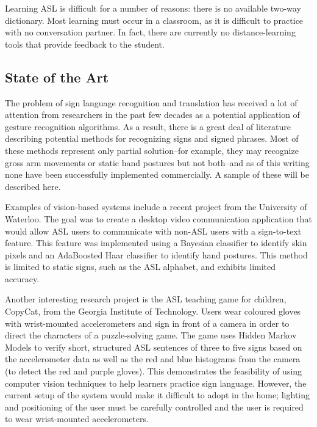 \documentclass[12pt]{article}
\begin{document}
Learning ASL is difficult for a number of reasons: there is no available two-way dictionary. Most learning must occur in a classroom, as it is difficult to practice with no conversation partner. In fact, there are currently no distance-learning tools that provide feedback to the student. 

\subsection{State of the Art}
The problem of sign language recognition and translation has received a lot of attention from researchers in the past few decades as a potential application of gesture recognition algorithms. As a result, there is a great deal of literature describing potential methods for recognizing signs and signed phrases. Most of these methods represent only partial solution--for example, they may recognize gross arm movements or static hand postures but not both--and as of this writing none have been successfully implemented commercially. A sample of these will be described here.

Examples of vision-based systems include a recent project from the University of Waterloo. The goal was to create a desktop video communication application that would allow ASL users to communicate with non-ASL users with a sign-to-text feature. This feature was implemented using a Bayesian classifier to identify skin pixels and an AdaBoosted Haar classifier to identify hand postures. This method is limited to static signs, such as the ASL alphabet, and exhibits limited accuracy.

Another interesting research project is the ASL teaching game for children, CopyCat, from the Georgia Institute of Technology. \cite{Zafrulla} Users wear coloured gloves with wrist-mounted accelerometers and sign in front of a camera in order to direct the characters of a puzzle-solving game. The game uses Hidden Markov Models to verify short, structured ASL sentences of three to five signs based on the accelerometer data as well as the red and blue histograms from the camera (to detect the red and purple gloves). This demonstrates the feasibility of using computer vision techniques to help learners practice sign language. However, the current setup of the system would make it difficult to adopt in the home; lighting and positioning of the user must be carefully controlled and the user is required to wear wrist-mounted accelerometers. 
\end{document}

